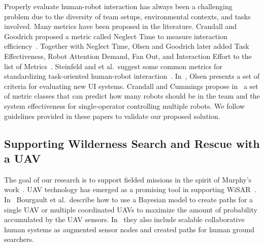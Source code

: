 Properly evaluate human-robot interaction has always been a challenging problem due to the diversity of team setups, environmental contexts, and tasks involved. Many metrics have been proposed in the literature. Crandall and Goodrich proposed a metric called Neglect Time to measure interaction efficiency~\cite{Crandall2002Principles}. Together with Neglect Time, Olsen and Goodrich later added Task Effectiveness, Robot Attention Demand, Fan Out, and Interaction Effort to the list of Metrics~\cite{Olsen2003Metrics}. Steinfeld and et al.\ suggest some common metrics for standardizing task-oriented human-robot interaction~\cite{Steinfeld2006Common}. In~\cite{Olsen2007Evaluating}, Olsen presents a set of criteria for evaluating new UI systems. Crandall and Cummings propose in~\cite{Crandall2007Ddentifying} a set of metric classes that can predict how many robots should be in the team and the system effectiveness for single-operator controlling multiple robots. We follow guidelines provided in these papers to validate our proposed solution.

\subsection{Supporting Wilderness Search and Rescue with a UAV}

The goal of our research is to support fielded missions in the spirit of Murphy's work~\cite{Casper2003Human}. UAV technology has emerged as a promising tool in supporting WiSAR~\cite{Murphy2008Cooperative,Bourgault2003Coordinated}. In~\cite{Bourgault2006Optimal, Bourgault2004Coordinated} Bourgault et al.\ describe how to use a Bayesian model to create paths for a single UAV or multiple coordinated UAVs to maximize the amount of probability accumulated by the UAV sensors. In~\cite{Bourgault2008AugmentedNodes} they also include scalable collaborative human systems as augmented sensor nodes and created paths for human ground searchers.

